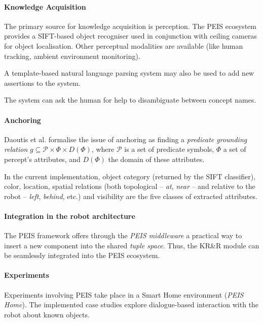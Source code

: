 \documentclass{IEEEtran}
\begin{document}
\paragraph{Knowledge Acquisition} The primary source for knowledge acquisition
is perception.  The PEIS ecosystem provides a SIFT-based object recogniser used
in conjunction with ceiling cameras for object localisation.  Other perceptual
modalities are available (like human tracking, ambient environment monitoring).

A template-based natural language parsing system may also be used to add new
assertions to the system.

The system can ask the human for help to disambiguate between concept names.

\paragraph{Anchoring} Daoutis et al. formalise the issue of anchoring as
finding a \emph{predicate grounding relation} $g \subseteq \mathcal{P} \times
\Phi \times D(\Phi)$, where $\mathcal{P}$ is a set of predicate symbols, $\Phi$
a set of percept's attributes, and $D(\Phi)$ the domain of these attributes.

In the current implementation, object category (returned by the SIFT
classifier), color, location, spatial relations (both topological -- \emph{at},
\emph{near} -- and relative to the robot -- \emph{left}, \emph{behind}, etc.)
and visibility are the five classes of extracted attributes.

\paragraph{Integration in the robot architecture}
\label{sect|peis-integration}

The PEIS framework offers through the \emph{PEIS middleware} a practical way to
insert a new component into the shared \emph{tuple space}.  Thus, the KR\&R
module can be seamlessly integrated into the PEIS ecosystem.

\paragraph{Experiments} Experiments involving PEIS take place in a Smart Home
environment (\emph{PEIS Home}). The implemented case studies explore
dialogue-based interaction with the robot about known objects.

\end{document}
